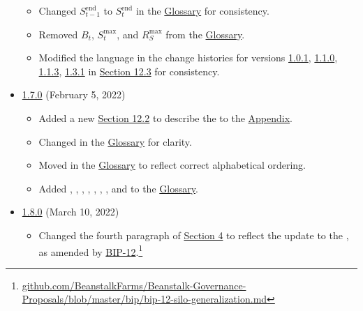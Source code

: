 \documentclass[class=article, crop=false]{standalone}
\begin{document}
\begin{itemize}[topsep=0pt, itemsep=3pt,leftmargin=16pt]
\begin{itemize}
        \item Changed $S_{t-1}^{\text{end}}$ to $S_t^{\text{end}}$ in the \hyperlink{subsection.14.11}{Glossary} for consistency. 
        \item Removed $B_t$, $S_t^{\text{max}}$, and $R_S^{\text{max}}$ from the \hyperlink{subsection.14.11}{Glossary}. 
        \item Modified the language in the change histories for versions \href{https://github.com/BeanstalkFarms/Beanstalk/blob/master/version-history/beanstalk1_0_1.pdf}{1.0.1}, \href{https://github.com/BeanstalkFarms/Beanstalk/blob/master/version-history/beanstalk1_1_0.pdf}{1.1.0}, \href{https://github.com/BeanstalkFarms/Beanstalk/blob/master/version-history/beanstalk1_1_3.pdf}{1.1.3}, \href{https://github.com/BeanstalkFarms/Beanstalk/blob/master/version-history/beanstalk1_3_1.pdf}{1.3.1} in \hyperlink{subsection.12.3}{Section 12.3} for consistency.
    \end{itemize}
    \newpage
    \item \href{https://github.com/BeanstalkFarms/Beanstalk/blob/master/version-history/beanstalk1_7_0.pdf}{1.7.0} (February 5, 2022)
    \begin{itemize}
        \item Added a new \hyperlink{subsection.12.2}{Section 12.2} to describe the  to the \hyperlink{section.14}{Appendix}.
        \item Changed  in the \hyperlink{subsection.14.11}{Glossary} for clarity. 
        \item Moved  in the \hyperlink{subsection.14.11}{Glossary} to reflect correct alphabetical ordering. 
        \item Added , , , , , , , and  to the \hyperlink{subsection.14.11}{Glossary}. 
    \end{itemize}
        \item \href{https://github.com/BeanstalkFarms/Beanstalk/blob/master/version-history/beanstalk1_8_0.pdf}{1.8.0} (March 10, 2022)
    \begin{itemize}
        \item Changed the fourth paragraph of \hyperlink{section.4}{Section 4} to reflect the update to the , as amended by \href{https://github.com/BeanstalkFarms/Beanstalk-Governance-Proposals/blob/master/bip/bip-12-silo-generalization.md}{BIP-12}.\footnote{\href{https://github.com/BeanstalkFarms/Beanstalk-Governance-Proposals/blob/master/bip/bip-12-silo-generalization.md}{github.com/BeanstalkFarms/Beanstalk-Governance-Proposals/blob/master/bip/bip-12-silo-generalization.md}}

\end{itemize}
\end{itemize}
\end{document}
